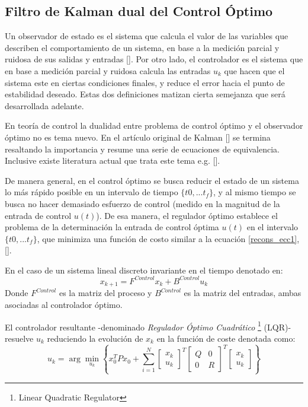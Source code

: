 \documentclass[10pt]{report}
\numberwithin{equation}{chapter}
\numberwithin{algorithm}{chapter}
\begin{document}
\subsection{Filtro de Kalman dual del Control Óptimo}\label{dualidad}
Un observador de estado es el sistema que calcula el valor de las variables que describen el comportamiento de un sistema, en base a la medición parcial y ruidosa de sus salidas y entradas [\cite{Buchi2010,Korovin2009}]. Por otro lado, el controlador es el sistema que en base a medición parcial y ruidosa calcula las entradas $u_k$ que hacen que el sistema este en ciertas condiciones finales, y reduce el error hacia el punto de estabilidad deseado. Estas dos definiciones matizan cierta semejanza que será desarrollada adelante.\par
En teoría de control la dualidad entre problema de control óptimo y el observador óptimo no es tema nuevo. En el artículo original de Kalman [\cite{Kalman1960}] se termina resaltando la importancia y resume una serie de ecuaciones de equivalencia. Inclusive existe literatura actual que trata este tema e.g. [\cite{Yan2012}].\par
De manera general, en el control óptimo se busca reducir el estado de un sistema lo más rápido posible en un intervalo de tiempo $\{t0,...t_f\}$, y al mismo tiempo se busca no hacer demasiado esfuerzo de control (medido en la magnitud de la entrada de control $u(t)$). De esa manera, el regulador óptimo establece el problema de la determinación la entrada de control óptima $u(t)$ en el intervalo $\{t0,...t_f\}$, que minimiza una función de costo similar a la ecuación \ref{recons_ecc1}, [\cite{Goodwin2000}].\par
En el caso de un sistema lineal discreto invariante en el tiempo denotado en:
\begin{equation}\label{chap2:ecc2}
x_{k+1}=F^{Control}x_k+B^{Control}u_k
\end{equation}
Donde $F^{Control}$ es la matriz del proceso y $B^{Control}$ es la matriz del entradas, ambas asociadas al controlador óptimo.\par
El controlador resultante -denominado \emph{Regulador Óptimo Cuadrático} \footnote{Linear Quadratic Regulator} (LQR)- resuelve $u_k$ reduciendo la evolución de $x_k$ en la función de coste denotada como:
\begin{equation}\label{chap2:ecc12}
{u}_k=\arg\min_{u_k}\left\{x_0^T
Px_0+ \sum_{i=1}^{N} \begin{bmatrix}{x}_k\\{u}_k\end{bmatrix}^T
\begin{bmatrix}Q&0\\0&R\end{bmatrix}^T \begin{bmatrix}{x}_k\\{u}_k\end{bmatrix} \right\}
\end{equation}
\end{document}
